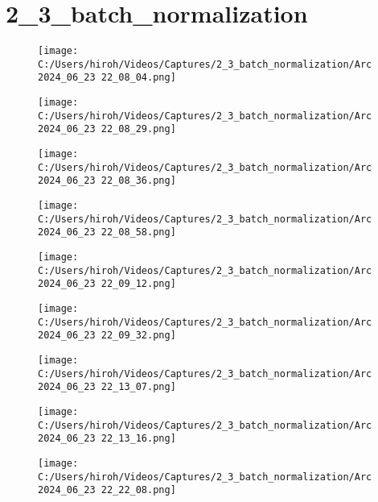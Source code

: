 \documentclass{ltjsarticle}
\begin{document}
\clearpage
\section{2\_3\_batch\_normalization}
\begin{figure}[htbp]
  \centering
  \texttt{[image: C:/Users/hiroh/Videos/Captures/2\_3\_batch\_normalization/Arc 2024\_06\_23 22\_08\_04.png]}
\end{figure}
\begin{figure}[htbp]
  \centering
  \texttt{[image: C:/Users/hiroh/Videos/Captures/2\_3\_batch\_normalization/Arc 2024\_06\_23 22\_08\_29.png]}
\end{figure}
\begin{figure}[htbp]
  \centering
  \texttt{[image: C:/Users/hiroh/Videos/Captures/2\_3\_batch\_normalization/Arc 2024\_06\_23 22\_08\_36.png]}
\end{figure}
\begin{figure}[htbp]
  \centering
  \texttt{[image: C:/Users/hiroh/Videos/Captures/2\_3\_batch\_normalization/Arc 2024\_06\_23 22\_08\_58.png]}
\end{figure}
\begin{figure}[htbp]
  \centering
  \texttt{[image: C:/Users/hiroh/Videos/Captures/2\_3\_batch\_normalization/Arc 2024\_06\_23 22\_09\_12.png]}
\end{figure}
\begin{figure}[htbp]
  \centering
  \texttt{[image: C:/Users/hiroh/Videos/Captures/2\_3\_batch\_normalization/Arc 2024\_06\_23 22\_09\_32.png]}
\end{figure}
\begin{figure}[htbp]
  \centering
  \texttt{[image: C:/Users/hiroh/Videos/Captures/2\_3\_batch\_normalization/Arc 2024\_06\_23 22\_13\_07.png]}
\end{figure}
\begin{figure}[htbp]
  \centering
  \texttt{[image: C:/Users/hiroh/Videos/Captures/2\_3\_batch\_normalization/Arc 2024\_06\_23 22\_13\_16.png]}
\end{figure}
\begin{figure}[htbp]
  \centering
  \texttt{[image: C:/Users/hiroh/Videos/Captures/2\_3\_batch\_normalization/Arc 2024\_06\_23 22\_22\_08.png]}
\end{figure}

\clearpage
\end{document}
